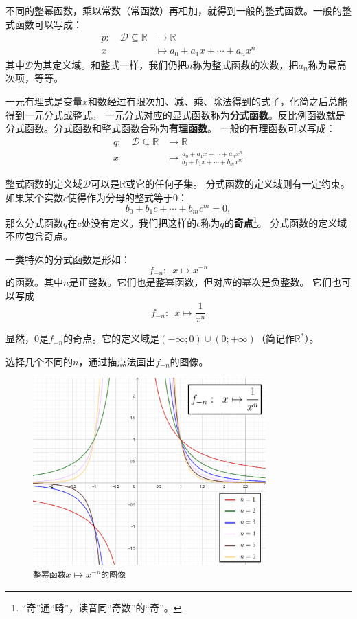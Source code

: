 \documentclass[12pt,UTF8]{ctexbook}
\begin{document}
不同的整幂函数，乘以常数（常函数）再相加，就得到一般的整式函数。一般的整式函数可以写成：
\begin{align*}
    p: \quad \mathcal{D} \subseteq \mathbb{R} &\rightarrow \mathbb{R}  \\
    x &\mapsto a_0 + a_1 x + \cdots + a_n x^n 
\end{align*}
其中$\mathcal{D}$为其定义域。和整式一样，我们仍把$n$称为整式函数的次数，把$a_n$称为最高次项，等等。

一元有理式是变量$x$和数经过有限次加、减、乘、除法得到的式子，化简之后总能得到一元分式或整式。
一元分式对应的显式函数称为\textbf{分式函数}。反比例函数就是分式函数。分式函数和整式函数合称为\textbf{有理函数}。
一般的有理函数可以写成：
\begin{align*}
    q: \quad \mathcal{D} \subseteq \mathbb{R} &\rightarrow \mathbb{R}  \\
    x &\mapsto \frac{a_0 + a_1 x + \cdots + a_n x^n}{b_0 + b_1x + \cdots + b_mx^m} 
\end{align*}

整式函数的定义域$\mathcal{D}$可以是$\mathbb{R}$或它的任何子集。
分式函数的定义域则有一定约束。如果某个实数$c$使得作为分母的整式等于$0$：
$$ b_0 + b_1c + \cdots + b_m c^m = 0, $$
那么分式函数$q$在$c$处没有定义。我们把这样的$c$称为$q$的\textbf{奇点}\footnote{“奇”通“畸”，读音同“奇数”的“奇”。}。
分式函数的定义域不应包含奇点。

一类特殊的分式函数是形如：
$$ f_{-n} : \,\,\, x \mapsto x^{-n}$$
的函数。其中$n$是正整数。它们也是整幂函数，但对应的幂次是负整数。
它们也可以写成
$$ f_{-n} : \,\,\, x \mapsto \frac{1}{x^n}$$

显然，$0$是$f_{-n}$的奇点。它的定义域是$(-\infty; 0)\cup(0; +\infty)$（简记作$\mathbb{R}^*$）。

选择几个不同的$n$，通过描点法画出$f_{-n}$的图像。

\begin{figure}[h]
    \vspace{4pt}
    \centering
    \includegraphics[width=0.8\textwidth]{tu/整幂函数2.png}
    \caption*{\texttt{整幂函数}$x\mapsto x^{-n}$\texttt{的图像}}
\end{figure}
\end{document}
